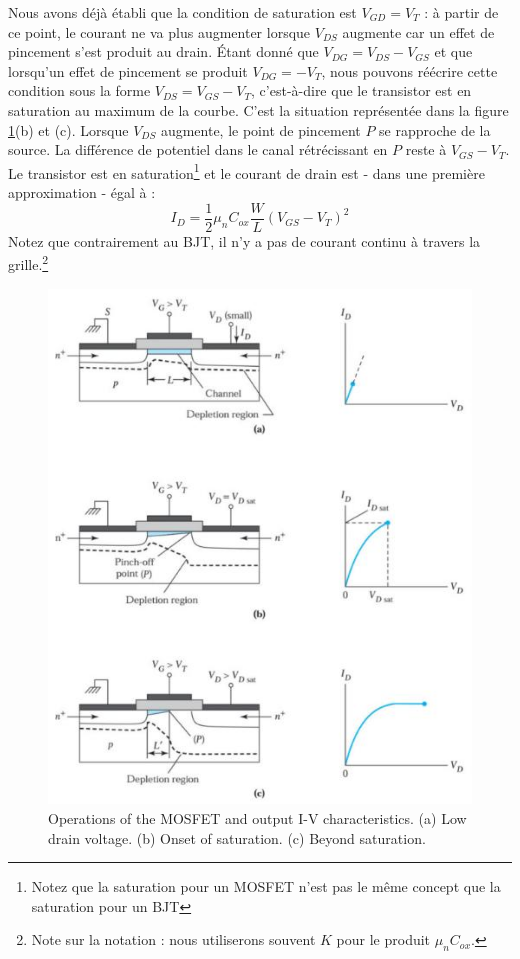 Nous avons déjà établi que la condition de saturation est $V_{GD} = V_T$ : à partir de ce point, le courant ne va plus augmenter lorsque $V_{DS}$ augmente car un effet de pincement s'est produit au drain. Étant donné que $V_{DG} = V_{DS} - V_{GS}$ et que lorsqu'un effet de pincement se produit $V_{DG} = -V_T$, nous pouvons réécrire cette condition sous la forme $V_{DS} = V_{GS} - V_T$, c'est-à-dire que le transistor est en saturation au maximum de la courbe. C'est la situation représentée dans la figure \ref{fig:mosfet2}(b) et (c). Lorsque $V_{DS}$ augmente, le point de pincement $P$ se rapproche de la source. La différence de potentiel dans le canal rétrécissant en $P$ reste à $V_{GS} - V_T$. Le transistor est en saturation\footnote{Notez que la saturation pour un MOSFET n'est pas le même concept que la saturation pour un BJT} et le courant de drain est - dans une première approximation - égal à :
\begin{equation}
    I_{D} = \frac{1}{2} \mu_n C_{ox} \frac{W}{L} (V_{GS} - V_T)^2
    \label{eq:sat_current}
\end{equation}
Notez que contrairement au BJT, il n'y a pas de courant continu à travers la grille.\footnote{Note sur la notation : nous utiliserons souvent $K$ pour le produit $\mu_n C_{ox}$.}

\begin{figure}[h!]
\centering
\includegraphics[width=12cm]{figures/ch01/mosfet2.jpg}
\caption{Operations of the MOSFET and output I-V characteristics. (a) Low drain voltage. (b) Onset of saturation. (c) Beyond saturation.} 
\label{fig:mosfet2}
\end{figure}

